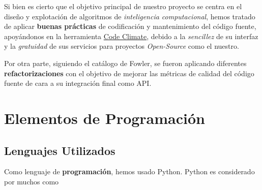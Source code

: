 Si bien es cierto que el objetivo principal de nuestro proyecto se centra en el diseño y explotación de algoritmos de \textit{inteligencia computacional}, hemos tratado de aplicar \textbf{buenas prácticas} de codificación y mantenimiento del código fuente, apoyándonos en la herramienta \href{https://codeclimate.com/github/jesgararm/GestorQuirofanos}{Code Climate}, debido a la \textit{sencillez} de su interfaz y la \textit{gratuidad} de sus servicios para proyectos \textit{Open-Source} como el nuestro.

Por otra parte, siguiendo el catálogo de Fowler\cite{Fowler1999Refactoring:Code}, se fueron aplicando diferentes \textbf{refactorizaciones} con el objetivo de mejorar las métricas de calidad del código fuente de cara a su integración final como API.


\section{Elementos de Programación}

\subsection{Lenguajes Utilizados}

Como lenguaje de \textbf{programación}, hemos usado Python\cite{VanRossum2009PythonManual}. Python es considerado por muchos como 





